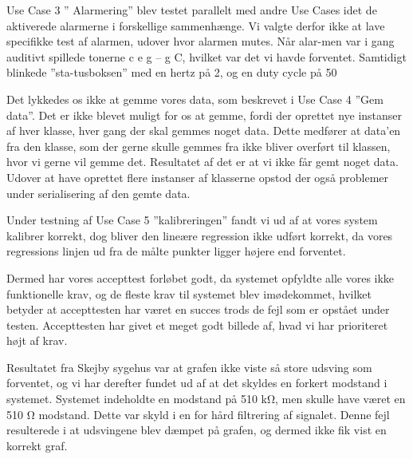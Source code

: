 Use Case 3 ” Alarmering” blev testet parallelt med andre Use Cases idet de aktiverede alarmerne i forskellige sammenhænge. Vi valgte derfor ikke at lave specifikke test af alarmen, udover hvor alarmen mutes. Når alar-men var i gang auditivt spillede tonerne c e g – g C, hvilket var det vi havde forventet. Samtidigt blinkede ”sta-tusboksen” med en hertz på 2, og en duty cycle på 50%

Det lykkedes os ikke at gemme vores data, som beskrevet i Use Case 4 ”Gem data”.  Det er ikke blevet muligt for os at gemme, fordi der oprettet nye instanser af hver klasse, hver gang der skal gemmes noget data. Dette medfører at data’en fra den klasse, som der gerne skulle gemmes fra ikke bliver overført til klassen, hvor vi gerne vil gemme det. Resultatet af det er at vi ikke får gemt noget data.
Udover at have oprettet flere instanser af klasserne opstod der også problemer under serialisering af den gemte data. 

Under testning af Use Case 5 ”kalibreringen” fandt vi ud af at vores system kalibrer korrekt, dog bliver den lineære regression ikke udført korrekt, da vores regressions linjen ud fra de målte punkter ligger højere end forventet. 

Dermed har vores accepttest forløbet godt, da systemet opfyldte alle vores ikke funktionelle krav, og de fleste krav til systemet blev imødekommet, hvilket betyder at accepttesten har været en succes trods de fejl som er opstået under testen. Accepttesten har givet et meget godt billede af, hvad vi har prioriteret højt af krav.

Resultatet fra Skejby sygehus var at grafen ikke viste så store udsving som forventet, og vi har derefter fundet ud af at det skyldes en forkert modstand i systemet. Systemet indeholdte en modstand på 510 kΩ, men skulle have været en 510 Ω modstand. Dette var skyld i en for hård filtrering af signalet. Denne fejl resulterede i at udsvingene blev dæmpet på grafen, og dermed ikke fik vist en korrekt graf.

